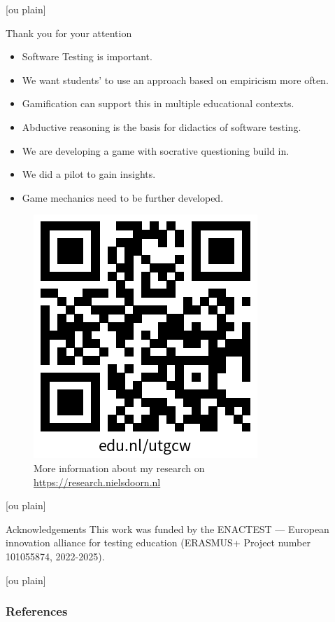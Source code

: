 \documentclass[aspectratio=169]{beamer}
\begin{document}

[ou plain]
\begin{frame}{Thank you for your attention}

\begin{itemize}
    \item Software Testing is important.
    \item We want students' to use an approach based on empiricism more often.
    \item Gamification can support this in multiple educational contexts.
    \item Abductive reasoning is the basis for didactics of software testing.
    \item We are developing a game with socrative questioning build in.
    \item We did a pilot to gain insights.
    \item Game mechanics need to be further developed.
\end{itemize}

\begin{figure}
    \centering
    \includegraphics[width=0.25\linewidth]{images//qr.png}
    \caption{More information about my research on \url{https://research.nielsdoorn.nl}}
\end{figure}
\end{frame}

[ou plain]
\begin{frame}{Acknowledgements}
    This work was funded by the ENACTEST — European innovation alliance for testing education (ERASMUS+ Project number 101055874, 2022-2025).
\end{frame}

[ou plain]
\begin{frame}%
    \frametitle{References}
    \printbibliography
\end{frame}
\end{document}

